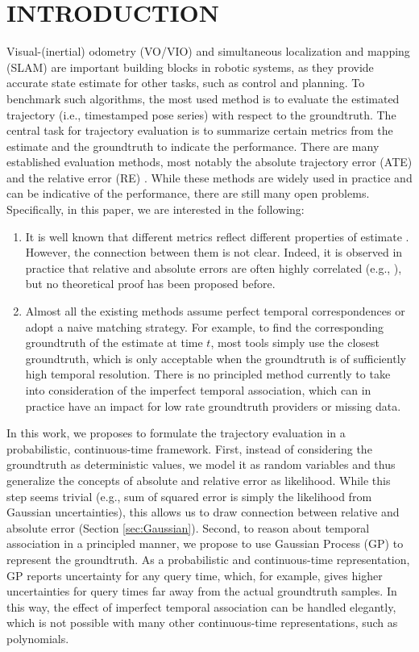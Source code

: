 {\section{INTRODUCTION}
Visual-(inertial) odometry (VO/VIO) and simultaneous localization and mapping (SLAM) are important building blocks in robotic systems, as they provide accurate state estimate for other tasks, such as control and planning. To benchmark such algorithms, the most used method is to evaluate the estimated trajectory (i.e., timestamped pose series) with respect to the groundtruth.
The central task for trajectory evaluation is to summarize certain metrics from the estimate and the groundtruth to indicate the performance. There are many established evaluation methods, most notably the absolute trajectory error (ATE) \cite{khan2016accuracy} and the relative error (RE) \cite{khan2017spatial}. While these methods are widely used in practice and can be indicative of the performance, there are still many open problems.
Specifically, in this paper, we are interested in the following:
\begin{enumerate}
    \item It is well known that different metrics reflect different properties of estimate \cite{khan2017spatial}. However, the connection between them is not clear. Indeed, it is observed in practice that relative and absolute errors are often highly correlated (e.g., \cite{khan2016accuracy}), but no theoretical proof has been proposed before.
    \item Almost all the existing methods assume perfect temporal correspondences or adopt a naive matching strategy. For example, to find the corresponding groundtruth of the estimate at time $t$, most tools simply use the closest groundtruth, which is only acceptable when the groundtruth is of sufficiently high temporal resolution. There is no principled method currently to take into consideration of the imperfect temporal association, which can in practice have an impact for low rate groundtruth providers or missing data.
\end{enumerate}
In this work, we proposes to formulate the trajectory evaluation in a probabilistic, continuous-time framework. First, instead of considering the groundtruth as deterministic values, we model it as random variables and thus generalize the concepts of absolute and relative error as likelihood. While this step seems trivial (e.g., sum of squared error is simply the likelihood from Gaussian uncertainties), this allows us to draw connection between relative and absolute error (Section \ref{sec:Gaussian}). Second, to reason about temporal association in a principled manner, we propose to use Gaussian Process (GP) to represent the groundtruth. As a probabilistic and continuous-time representation, GP reports uncertainty for any query time, which, for example, gives higher uncertainties for query times far away from the actual groundtruth samples. In this way, the effect of imperfect temporal association can be handled elegantly, which is not possible with many other continuous-time representations, such as polynomials.
}
